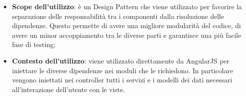 		\begin{itemize}
			\item \textbf{Scope dell'utilizzo}: è un Design Pattern che viene utilizzato per favorire la separazione delle responsabilità tra i componenti dalla risoluzione delle dipendenze. Questo permette di avere una migliore modularità del codice, di avere un minor accoppiamento tra le diverse parti e garantisce una più facile fase di testing;
			\item \textbf{Contesto dell'utilizzo}: viene utilizzato direttamente da AngularJS per iniettare le diverse dipendenze nei moduli che le richiedono. In particolare vengono iniettati nei controller tutti i servizi e i modelli dei dati necessari all'interazione dell'utente con le viste.
		\end{itemize}

